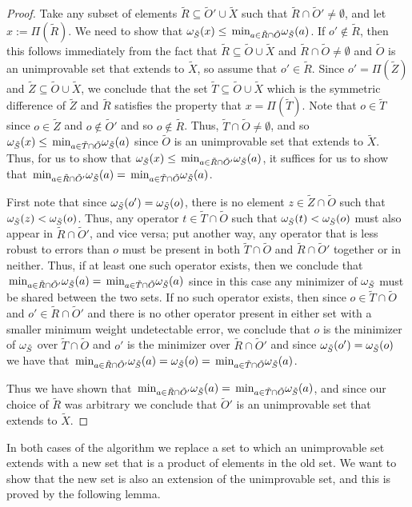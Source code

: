 \documentclass[twocolumn,showpacs,preprintnumbers,amsmath,amssymb,nofootinbib,pra,floatfix]{revtex4-1}
\newenvironment{remark}[1][Remark]{\begin{trivlist}
\item[\hskip \labelsep {\bfseries #1}]}{\end{trivlist}}
\newcommand{\set}{\tilde}
\begin{document}
\begin{proof}
Take any subset of elements $\set R\subseteq\set O'\cup\set X$ such that $\set R\cap\set O'\ne\emptyset$, and let $x := \Pi(\set R)$.  We need to show that $\om_{\set S}(x) \le \min_{a\in\set R\cap\set O}\om_{\set S}(a)$.  If $o'\notin\set R$, then this follows immediately from the fact that $\set R\subseteq\set O\cup \set X$ and $\set R\cap\set O\ne\emptyset$ and $\set O$ is an unimprovable set that extends to $\set X$, so assume that $o'\in\set R$.  Since $o'=\Pi(\set Z)$ and $\set Z\subseteq\set O\cup\set X$, we conclude that the set $\set T\subseteq\set O\cup\set X$ which is the symmetric difference of $\set Z$ and $\set R$ satisfies the property that $x=\Pi(\set T)$.  Note that $o\in\set T$ since $o\in \set Z$ and $o\notin \set O'$ and so $o\notin \set R$.  Thus, $\set T \cap\set O\ne\emptyset$, and so $\om_{\set S}(x)\le \min_{a\in\set T\cap\set O}\om_{\set S}(a)$ since $\set O$ is an unimprovable set that extends to $\set X$.  Thus, for us to show that $\om_{\set S}(x) \le \min_{a\in\set R\cap\set O'}\om_{\set S}(a)$, it suffices for us to show that $\min_{a\in\set R\cap\set O'}\om_{\set S}(a)=\min_{a\in\set T\cap\set O}\om_{\set S}(a)$.

First note that since $\om_{\set S}(o')=\om_{\set S}(o)$, there is no element $z\in\set Z\cap\set O$ such that $\om_{\set S}(z)<\om_{\set S}(o)$.  Thus, any operator $t\in\set T\cap\set O$ such that $\om_{\set S}(t)<\om_{\set S}(o)$ must also appear in $\set R\cap\set O'$, and vice versa;  put another way, any operator that is less robust to errors than $o$ must be present in both $\set T\cap\set O$ and $\set R\cap\set O'$ together or in neither.  Thus, if at least one such operator exists, then we conclude that $\min_{a\in\set R\cap\set O'}\om_{\set S}(a)=\min_{a\in\set T\cap\set O}\om_{\set S}(a)$ since in this case any minimizer of $\om_{\set S}$ must be shared between the two sets.  If no such operator exists, then since $o\in\set T\cap\set O$ and $o'\in\set R\cap\set O'$ and there is no other operator present in either set with a smaller minimum weight undetectable error, we conclude that $o$ is the minimizer of $\om_{\set S}$ over $\set T\cap\set O$ and $o'$ is the minimizer over $\set R\cap\set O'$ and since $\om_{\set S}(o')=\om_{\set S}(o)$ we have that $\min_{a\in\set R\cap\set O'}\om_{\set S}(a)=\om_{\set S}(o)=\min_{a\in\set T\cap\set O}\om_{\set S}(a)$.

Thus we have shown that $\min_{a\in\set R\cap\set O'}\om_{\set S}(a)=\min_{a\in\set T\cap\set O}\om_{\set S}(a)$, and since our choice of $\set R$ was arbitrary we conclude that $\set O'$ is an unimprovable set that extends to $\set X$.
\end{proof}
\begin{remark}
In both cases of the algorithm we replace a set to which an unimprovable set extends with a new set that is a product of elements in the old set.  We want to show that the new set is also an extension of the unimprovable set, and this is proved by the following lemma.
\end{remark}
\end{document}
